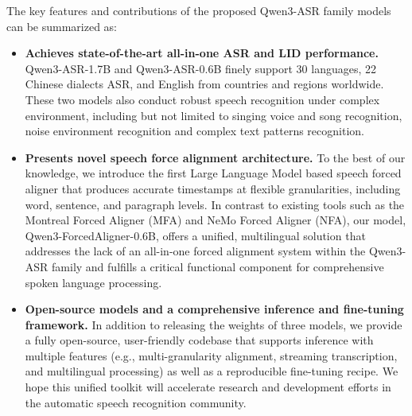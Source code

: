The key features and contributions of the proposed Qwen3-ASR family models can be summarized as:

\begin{itemize}

\item \textbf{Achieves state-of-the-art all-in-one ASR and LID performance.} Qwen3-ASR-1.7B and Qwen3-ASR-0.6B finely support 30 languages, 22 Chinese dialects ASR, and English from countries and regions worldwide. These two models also conduct robust speech recognition under complex environment, including but not limited to singing voice and song recognition, noise environment recognition and complex text patterns recognition.

\item \textbf{Presents novel speech force alignment architecture.} To the best of our knowledge, we introduce the first Large Language Model based speech forced aligner that produces accurate timestamps at flexible granularities, including word, sentence, and paragraph levels. In contrast to existing tools such as the Montreal Forced Aligner (MFA) and NeMo Forced Aligner (NFA), our model, Qwen3-ForcedAligner-0.6B, offers a unified, multilingual solution that addresses the lack of an all-in-one forced alignment system within the Qwen3-ASR family and fulfills a critical functional component for comprehensive spoken language processing.

\item \textbf{Open-source models and a comprehensive inference and fine-tuning framework.} In addition to releasing the weights of three models, we provide a fully open-source, user-friendly codebase that supports inference with multiple features (e.g., multi-granularity alignment, streaming transcription, and multilingual processing) as well as a reproducible fine-tuning recipe. We hope this unified toolkit will accelerate research and development efforts in the automatic speech recognition community.%

\end{itemize}
